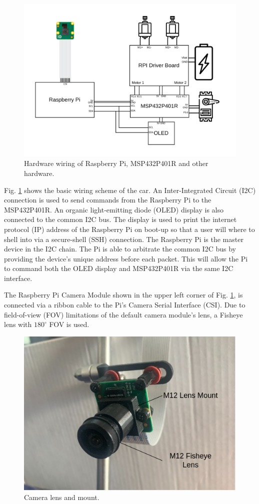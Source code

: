 \documentclass{article}
\begin{document}
\begin{figure}[htb]
	\centering
	\centerline{\includegraphics[width=1.0\linewidth]{wiring}}
	\caption{Hardware wiring of Raspberry Pi, MSP432P401R and other hardware.}
	\label{fig:hardware}
\end{figure}

Fig. \ref{fig:hardware} shows the basic wiring scheme of the car. An
Inter-Integrated Circuit (I2C) connection is used to send commands from the 
Raspberry Pi to the MSP432P401R. An organic light-emitting diode (OLED) display
is also connected to the common I2C bus. The display is used to print the
internet protocol (IP) address of the Raspberry Pi on boot-up so that a user will
where to shell into via a secure-shell (SSH) connection. The Raspberry Pi
is the master device in the I2C chain. The Pi is able to arbitrate the common I2C
bus by providing the device's unique address before each packet. This will allow
the Pi to command both the OLED display and MSP432P401R via the same I2C interface.

The Raspberry Pi Camera Module shown in the upper left corner of Fig.
\ref{fig:hardware}, is connected via a ribbon cable to the Pi's
Camera Serial Interface (CSI). Due to field-of-view (FOV) limitations of the
default camera module's lens, a Fisheye lens with $180^{\circ}$ FOV is used.

\begin{figure}[htb]
	\centering
	\centerline{\includegraphics[width=0.7\linewidth]{camera_annotated}}
	\caption{Camera lens and mount.}
	\label{fig:camera}
\end{figure}
\end{document}
